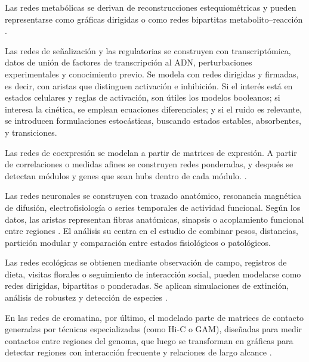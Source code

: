 \documentclass[11pt]{article}
\begin{document}
Las redes metabólicas se derivan de reconstrucciones estequiométricas y pueden representarse como gráficas dirigidas o como redes bipartitas metabolito--reacción \parencite{Koutrouli2020}.

Las redes de señalización y las regulatorias se construyen con transcriptómica, datos de unión de factores de transcripción al ADN, perturbaciones experimentales y conocimiento previo. Se modela con redes dirigidas y firmadas, es decir, con aristas que distinguen activación e inhibición. Si el interés está en estados celulares y reglas de activación, son útiles los modelos booleanos; si interesa la cinética, se emplean ecuaciones diferenciales; y si el ruido es relevante, se introducen formulaciones estocásticas, buscando estados estables, absorbentes, y transiciones. \parencite{EmmertStreib2014,BanfRhee2017,Kauffman1969,Elowitz2002}


Las redes de coexpresión se modelan a partir de matrices de expresión. A partir de correlaciones o medidas afines se construyen redes ponderadas, y después se detectan módulos y genes que sean hubs dentro de cada módulo. \parencite{ZhangHorvath2005}. 

Las redes neuronales se construyen con trazado anatómico, resonancia magnética de difusión, electrofisiología o series temporales de actividad funcional. Según los datos, las aristas representan fibras anatómicas, sinapsis o acoplamiento funcional entre regiones \parencite{BullmoreSporns2009}. El análisis su centra en el estudio de combinar pesos, distancias, partición modular y comparación entre estados fisiológicos o patológicos.

Las redes ecológicas se obtienen mediante observación de campo, registros de dieta, visitas florales o seguimiento de interacción social, pueden modelarse como redes dirigidas, bipartitas o ponderadas. Se aplican simulaciones de extinción, análisis de robustez y detección de especies \parencite{Bascompte2009,Memmott2004,Olesen2007}. 

En las redes de cromatina, por último, el modelado parte de matrices de contacto generadas por técnicas especializadas (como Hi-C o GAM), diseñadas para medir contactos entre regiones del genoma, que luego se transforman en gráficas para detectar regiones con interacción frecuente y relaciones de largo alcance \parencite{Beagrie2017}.


\end{document}
